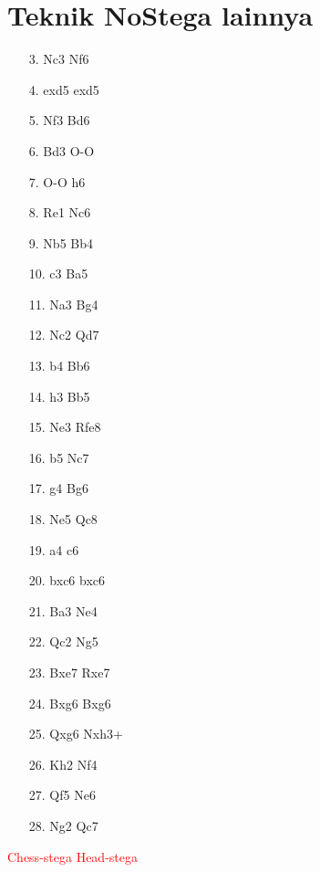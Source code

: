 \documentclass{article}
\begin{document}

\section*{Teknik NoStega lainnya}

\vspace{94.45mm}

\begin{enumerate}
  \item[3.] Nc3 \quad Nf6
  \item[4.] exd5 \quad exd5
  \item[5.] Nf3 \quad Bd6
  \item[6.] Bd3 \quad O-O
  \item[7.] O-O \quad h6
  \item[8.] Re1 \quad Nc6
  \item[9.] Nb5 \quad Bb4
  \item[10.] c3 \quad Ba5
  \item[11.] Na3 \quad Bg4
  \item[12.] Nc2 \quad Qd7
  \item[13.] b4 \quad Bb6
  \item[14.] h3 \quad Bb5
  \item[15.] Ne3 \quad Rfe8
  \item[16.] b5 \quad Nc7
  \item[17.] g4 \quad Bg6
  \item[18.] Ne5 \quad Qc8
  \item[19.] a4 \quad c6
  \item[20.] bxc6 \quad bxc6
  \item[21.] Ba3 \quad Ne4
  \item[22.] Qc2 \quad Ng5
  \item[23.] Bxe7 \quad Rxe7
  \item[24.] Bxg6 \quad Bxg6
  \item[25.] Qxg6 \quad Nxh3+
  \item[26.] Kh2 \quad Nf4
  \item[27.] Qf5 \quad Ne6
  \item[28.] Ng2 \quad Qc7
\end{enumerate}

\vspace{10mm}

\begin{center}
\textcolor{red}{Chess-stega} \quad \quad \quad \quad \quad \quad \quad \textcolor{red}{Head-stega}
\end{center}
\end{document}
